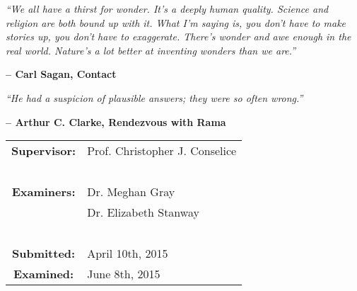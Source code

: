%
%

\clearpage
\thispagestyle{empty}

\begin{center}


\emph{``We all have a thirst for wonder. It's a deeply human quality. Science and religion are both bound up with it. What I'm saying is, you don't have to make stories up, you don't have to exaggerate. There's wonder and awe enough in the real world. Nature's a lot better at inventing wonders than we are.”}
\begin{flushright}
{\bf -- Carl Sagan, Contact}
\end{flushright}


\emph{``He had a suspicion of plausible answers; they were so often wrong.” }
\begin{flushright}
{\bf --  Arthur C. Clarke, Rendezvous with Rama}
\end{flushright}

\begin{minipage}[c]{8cm}
\begin{tabular}{cl}
{\bf Supervisor:} & Prof. Christopher J. Conselice\\
~ & ~ \\
{\bf Examiners:} & Dr. Meghan Gray\\
~ & Dr. Elizabeth Stanway\\
~ & ~ \\

{\bf Submitted:} & April 10th, 2015\\

{\bf Examined:} & June 8th, 2015\\

\end{tabular}
\end{minipage}
\end{center}

\clearpage


